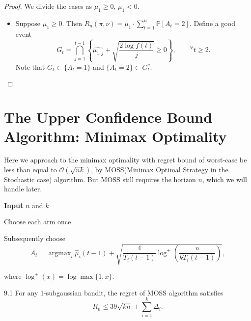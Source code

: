 \documentclass[10pt]{article}
\newenvironment{theorem*}[1]{%
  \IfBlankTF{#1}
    {\renewcommand{\themanualtheoreminner}{\unskip}}
    {\renewcommand\themanualtheoreminner{#1}}%
  \manualtheoreminner
}{\endmanualtheoreminner}
\theoremstyle{definition}
\DeclareMathOperator*{\argmax}{argmax}
\begin{document}
\begin{proof}
    We divide the cases as $\mu_1 \geq 0$, $\mu_1 < 0$.
    \begin{itemize}
        \item[(1)] Suppose $\mu_1 \geq 0$.
        Then $R_n(\pi, \nu) = \mu_1 \cdot \sum_{t=1}^n \mathbb{P} \left[ A_t = 2 \right]$.
        Define a good event
        \begin{equation*}
            G_t = \bigcap_{j=1}^{t-1} \left\{ \hat{\mu_{1,j}} + \sqrt{\frac{2\log f(t)}{j}}\geq 0 \right\}, \qquad ^\forall t \geq 2.
        \end{equation*}
        Note that $G_t \subset \{A_t=1\}$ and $\{A_t = 2\} \subset G_t^c$.
    \end{itemize}
\end{proof}


\section{The Upper Confidence Bound Algorithm: Minimax Optimality}

Here we approach to the minimax optimality with regret bound of worst-case be less than equal to $\mathcal{O}(\sqrt{nk})$, by MOSS(Minimax Optimal Strategy in the Stochastic case) algorithm.
But MOSS still requires the horizon $n$, which we will handle later.

\begin{algorithm*}[H]
    \caption{MOSS}
    \textbf{Input} $n$ and $k$

    Choose each arm once

    Subsequently choose
    \begin{equation*}
        A_t = \argmax_{i} \hat{\mu}_i (t-1) + \sqrt{\frac{4}{T_i (t-1)} \log^{+} \left( \frac{n}{k T_i (t-1)} \right)},
    \end{equation*}
    \begin{center}
        where $\log^{+} (x) = \log \max \{1, x\}$.
    \end{center}
\end{algorithm*}

\begin{theorem*}{9.1}
    For any 1-subgaussian bandit, the regret of MOSS algorithm satisfies
    \begin{equation*}
        R_n \leq 39\sqrt{kn} + \sum_{i=1}^k \Delta_i.
    \end{equation*}
\end{theorem*}
\end{document}
